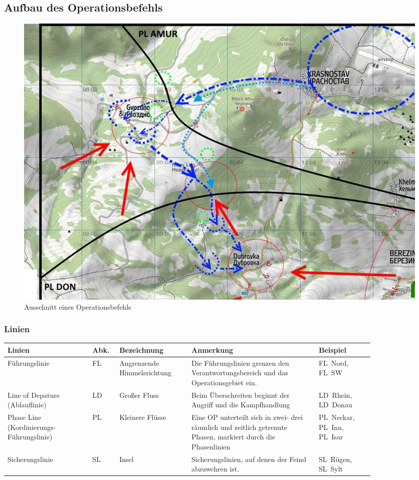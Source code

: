 \pagebreak
\subsection{Aufbau des Operationsbefehls}
\label{OPbef}

\begin{figure}[h]
	\centering
	\includegraphics[width=\textwidth]{../img/advanced/kartenarbeit/op-befehl}
	\caption[Ausschnitt eines Operationsbefehls]{Ausschnitt eines Operationsbefehls\footnotemark}
	\label{fig:OP-Befehl}
\end{figure}

\subsubsection{Linien}
\begin{longtable}{P{0.2\linewidth}P{0.05\linewidth}P{0.17\linewidth}P{0.3\linewidth}P{0.13\linewidth}} 	
	\toprule
	Linien & Abk. & Bezeichnung & Anmerkung & Beispiel\\ 
	\midrule
	Führungslinie & FL & Angrenzende Himmelsrichtung & Die Führungslinien grenzen  den Verantwortungsbereich und das Operationsgebiet ein. & FL~Nord, FL~SW \\ 
	Line of Depature (Ablauflinie) & LD & Großer Fluss & Beim Überschreiten beginnt der Angriff und die Kampfhandlung & LD~Rhein, LD~Donau\\ 
	Phase Line (Kordinierungs-Führungslinie) & PL & Kleinere Flüsse & Eine OP unterteilt sich in zwei- drei räumlich und zeitlich getrennte Phasen, markiert durch die Phasenlinien & PL~Neckar, PL~Inn, PL~Isar\\ 
	Sicherungslinie & SL & Insel & Sicherungslinien, auf denen der Feind abzuwehren ist. & SL~Rügen, SL~Sylt\\ 
	\bottomrule
\end{longtable}

